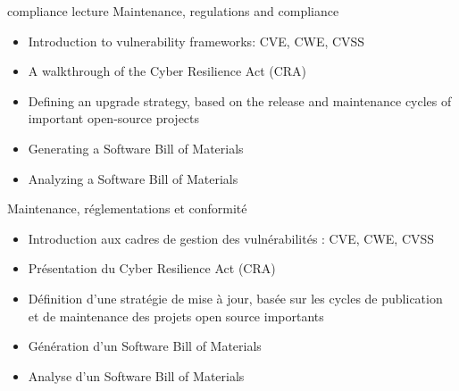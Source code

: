 {compliance}
{lecture}
{Maintenance, regulations and compliance}
{
  \begin{itemize}
  \item Introduction to vulnerability frameworks: CVE, CWE, CVSS
  \item A walkthrough of the Cyber Resilience Act (CRA)
  \item Defining an upgrade strategy, based on the release and
    maintenance cycles of important open-source projects
  \item Generating a Software Bill of Materials
  \item Analyzing a Software Bill of Materials
  \end{itemize}
}
{Maintenance, réglementations et conformité}
{
  \begin{itemize}
  \item Introduction aux cadres de gestion des vulnérabilités : CVE,
    CWE, CVSS
  \item Présentation du Cyber Resilience Act (CRA)
  \item Définition d’une stratégie de mise à jour, basée sur les
    cycles de publication et de maintenance des projets open source
    importants
  \item Génération d’un Software Bill of Materials
  \item Analyse d’un Software Bill of Materials
  \end{itemize}
}

